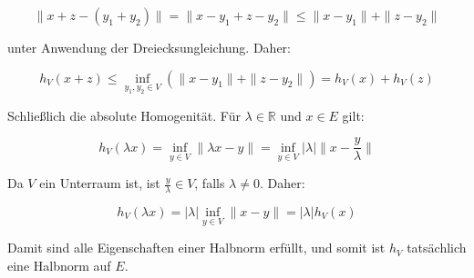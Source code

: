\documentclass[11pt,a4paper]{article}
\begin{document}
\[
\|x + z - (y_1 + y_2)\| = \|x - y_1 + z - y_2\| \leq \|x - y_1\| + \|z - y_2\|
\]

unter Anwendung der Dreiecksungleichung. Daher:

\[
h_V(x + z) \leq \inf_{y_1, y_2 \in V} (\|x - y_1\| + \|z - y_2\|) = h_V(x) + h_V(z)
\]

Schließlich die absolute Homogenität. Für \( \lambda \in \mathbb{R} \) und \( x \in E \) gilt:

\[
h_V(\lambda x) = \inf_{y \in V} \|\lambda x - y\| = \inf_{y \in V} |\lambda|\|x - \frac{y}{\lambda}\|
\]

Da \( V \) ein Unterraum ist, ist \(\frac{y}{\lambda} \in V\), falls \(\lambda \neq 0\). Daher:

\[
h_V(\lambda x) = |\lambda| \inf_{y \in V} \|x - y\| = |\lambda| h_V(x)
\]

Damit sind alle Eigenschaften einer Halbnorm erfüllt, und somit ist \( h_V \) tatsächlich eine Halbnorm auf \( E \).

\end{document}
